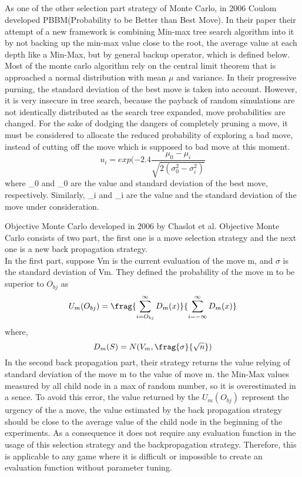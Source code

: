 \documentclass[11pt]{article}
\begin{document}
\subsection{}
As one of the other selection part strategy of Monte Carlo, in 2006 Coulom developed PBBM(Probability to be Better than Best Move)\cite{coulom2006efficient}. In their paper their attempt of a new framework is combining Min-max tree search algorithm into it by not backing up the min-max value close to the root, the average value at each depth like a Min-Max, but by general backup operator, which is defined below. 
Most of the monte carlo algorithm rely on the central limit theorem that is approached a normal distribution with mean \(\mu\) and variance. In their progressive purning, the standard deviation of the best move is taken into account. However, it is very insecure in tree search, because the payback of random simulations are not identically distributed as the search tree expanded, move probabilities are changed. For the sake of dodging the dangers of completely pruning a move, it must be considered to allocate the reduced probability of exploring a bad move, instead of cutting off the move which is supposed to bad move at this moment.   
\[u_{i} = exp(-2.4\frac{\mu_{0} - \mu_{i}}{\sqrt{2(\sigma^2_{0} - \sigma^2_{i})}}\]
where \mu_{0} and \sigma_{0} are the value and standard deviation of the best move, respectively. Similarly, \mu_{i} and \sigma_{i} are the value and the standard deviation of the move under consideration.

Objective Monte Carlo developed in 2006 by Chaslot et al\cite{chaslot2006monte}. Objective Monte Carlo consists of two part, the first one is a move selection strategy and the next one is a new back propagation strategy. \\
In the first part, suppose Vm is the current evaluation of the move m, and \(\sigma\) is the standard deviation of Vm. They defined the probability of the move m to be superior to \(O_{bj}\) as 
\[U_{m}(O_{bj}) = \frag
	{\sum_{i=O_{bj}}^{\infty} D_{m}(x)}
	{\sum_{i=-\infty}^{\infty} D_{m}(x)}\]
where, \[D_{m}(S) = N(V_{m}, \frag{\sigma}{\sqrt n}) \]
In the second back propagation part, their strategy returns the value relying of standard deviation of the move m to the value of move m. the Min-Max values measured by all child node in a max of random number, so it is overestimated in a sence. To avoid this error, the value returned by the 
\(U_{m}(O_{bj})\) represent the urgency of the a move, the value estimated by the back propagation strategy should be close to the average value of the child node in the beginning of the experiments.
As a consequence it does not require any evaluation function in the usage of this selection strategy and the backpropagation strategy. Therefore, this is applicable to any game where it is difficult or impossible  to create an evaluation function without parameter tuning.
\end{document}
